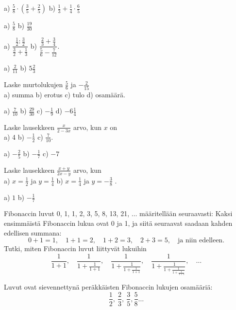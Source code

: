\begin{tehtava}
a) $\frac{5}{8}\cdot(\frac{3}{5}+\frac{2}{5})$ \qquad b) $\frac{1}{3}+\frac{1}{4}\cdot\frac{6}{5}$
\begin{vastaus}
a) $\frac{5}{8}$ \qquad b) $\frac{19}{30}$
\end{vastaus}
\end{tehtava}

\begin{tehtava}
a) $\dfrac{\frac{1}{2}:\frac{3}{2}}{\frac{3}{2}+\frac{1}{3}}$ \qquad b) $\dfrac{\frac{2}{3}+\frac{3}{4}}{\frac{5}{6}-\frac{7}{12}}$.
\begin{vastaus}
a) $\frac{2}{11}$ \qquad b) $5\frac{2}{3}$
\end{vastaus}
\end{tehtava}

\begin{tehtava}
Laske murtolukujen $\frac{5}{6}$ ja $-\frac{2}{15}$ \\ a) summa \qquad b) erotus \qquad c) tulo \qquad d) osamäärä.
\begin{vastaus}
a) $\frac{7}{10}$ \qquad b) $\frac{29}{30}$ \qquad c) $-\frac{1}{9}$ \qquad d) $-6\frac{1}{4}$
\end{vastaus}
\end{tehtava}

\begin{tehtava}
Laske lausekkeen $\frac{x}{2-3x}$ arvo, kun $x$ on \\ a) 4 \qquad b) $-\frac{1}{2}$ \qquad c) $\frac{7}{10}$.
\begin{vastaus}
a) $-\frac{2}{5}$ \qquad b) $-\frac{1}{7}$ \qquad c) $-7$
\end{vastaus}
\end{tehtava}

\begin{tehtava}
Laske lausekkeen $\frac{x+y}{2x-y}$ arvo, kun \\ a) $x=\frac{1}{2}$ ja $y= \frac{1}{4}$ \qquad b) $x=\frac{1}{4}$ ja $y= -\frac{3}{8}$ \qquad.
\begin{vastaus}
a) $1$ \qquad b) $-\frac{1}{7}$
\end{vastaus}
\end{tehtava}

\begin{tehtava}
Fibonaccin luvut 0, 1, 1, 2, 3, 5, 8, 13, 21, $\ldots$ määritellään seuraavasti: Kaksi ensimmäistä
Fibonaccin lukua ovat 0 ja 1, ja siitä seuraavat saadaan kahden
edellisen summana: 
\[ 0+1=1, \quad 1+1=2, \quad 1+2 = 3, \quad 2+3=5, \quad 
\textrm{ja niin edelleen.} \]
Tutki, miten Fibonaccin luvut liittyvät lukuihin
\[ \frac{1}{1+1}, \quad \frac{1}{1+\frac{1}{1+1}}, \quad
\frac{1}{1+\frac{1}{1+\frac{1}{1+1}}}, \quad 
\frac{1}{1+\frac{1}{1+\frac{1}{1+\frac{1}{1+1}}}}, \quad \ldots\]
\begin{vastaus}
Luvut ovat sievennettynä peräkkäisten Fibonaccin
lukujen osamääriä:
\[\frac{1}{2}, \ \frac{2}{3}, \ \frac{3}{5}, \frac{5}{8} \ldots  \]
\end{vastaus}
\end{tehtava}

